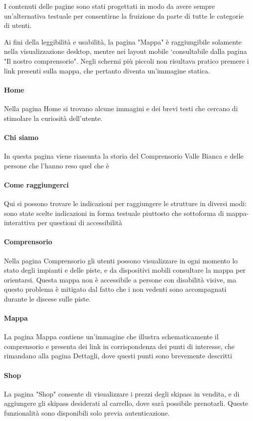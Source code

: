 I contenuti delle pagine sono stati progettati in modo da avere sempre un'alternativa testuale per consentirne la fruizione da parte di tutte le categorie di utenti.

Ai fini della leggibilità e usabilità, la pagina "Mappa" è raggiungibile solamente nella visualizzazione desktop, mentre nei layout mobile `consultabile dalla pagina "Il nostro comprensorio".
Negli schermi più piccoli non risultava pratico premere i link presenti sulla mappa, che pertanto diventa un'immagine statica.
\paragraph{Home} Nella pagina Home si trovano alcune immagini e dei brevi testi che cercano di stimolare la curiosità dell'utente.
\paragraph{Chi siamo}
In questa pagina viene riassunta la storia del Comprensorio Valle Bianca e delle persone che l'hanno reso quel che è
\paragraph{Come raggiungerci}
Qui si possono trovare le indicazioni per raggiungere le strutture in diversi modi: sono state scelte indicazioni in forma testuale piuttosto che sottoforma di mappa-interattiva per questioni di accessibilità
\paragraph{Comprensorio}
Nella pagina Comprensorio gli utenti possono visualizzare in ogni momento lo stato degli impianti e delle piste, e da dispositivi mobili consultare la mappa per orientarsi. Questa mappa non è accessibile a persone con disabilità visive, ma questo problema è mitigato dal fatto che i non vedenti sono accompagnati durante le discese sulle piste.
\paragraph{Mappa}
La pagina Mappa contiene un'immagine che illustra schematicamente il comprensorio e presenta dei link in corrispondenza dei punti di interesse, che rimandano alla pagina Dettagli, dove  questi punti sono brevemente descritti
\paragraph{Shop}
La pagina "Shop" consente di visualizzare i prezzi degli skipass in vendita, e di aggiungere gli skipass desiderati al carrello, dove sarà possibile prenotarli. Queste funzionalità sono disponibili solo previa autenticazione.
